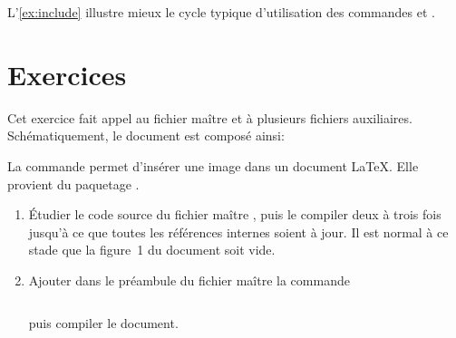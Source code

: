 L'\autoref{ex:include} illustre mieux le cycle typique
d'utilisation des commandes \cmd{} et \cmd{}.




\section{Exercices}
\label{sec:include:exercices}

\begin{exercice}[nosol]
  \label{ex:include}
  Cet exercice fait appel au fichier maître
   et à plusieurs fichiers auxiliaires.
  Schématiquement, le document est composé ainsi:

  \medskip
  \begin{minipage}{\linewidth}
  \end{minipage}
  \medskip

  La commande  permet d'insérer une image dans
  un document {\LaTeX}. Elle provient du paquetage .

  \begin{enumerate}
  \item Étudier le code source du fichier maître
    , puis le compiler deux à trois
    fois jusqu'à ce que toutes les références internes soient à jour.
    Il est normal à ce stade que la figure~1 du document soit vide.
  \item Ajouter dans le préambule du fichier maître la commande
\begin{lstlisting}

\end{lstlisting}
    puis compiler le document.


\end{enumerate}
\end{exercice}
